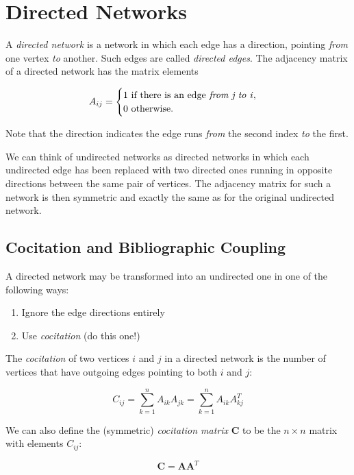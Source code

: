 \documentclass[12pt]{book}
\begin{document}
\section{Directed Networks}
A \textit{directed network} is a network in which each edge has a direction, pointing \textit{from} one vertex \textit{to} another.  Such edges are called \textit{directed edges}.  The adjacency matrix of a directed network has the matrix elements

\begin{equation}
A_{ij} = 
  \begin{cases}
    1$ if there is an edge \textit{from j to i}$, \\
    0$ otherwise$.
  \end{cases}
\end{equation}

Note that the direction indicates the edge runs \textit{from} the second index \textit{to} the first. 

We can think of undirected networks as directed networks in which each undirected edge has been replaced with two directed ones running in opposite directions between the same pair of vertices.  The adjacency matrix for such a network is then symmetric and exactly the same as for the original undirected network.

\subsection{Cocitation and Bibliographic Coupling}
A directed network may be transformed into an undirected one in one of the following ways:
\begin{enumerate}
  \item Ignore the edge directions entirely
  \item Use \textit{cocitation} (do this one!)
\end{enumerate}
The \textit{cocitation} of two vertices $i$ and $j$ in a directed network is the number of vertices that have outgoing edges pointing to both $i$ and $j$:

\begin{equation}
C_{ij} = \sum\limits_{k=1}^n A_{ik}A_{jk} = \sum\limits_{k=1}^n A_{ik}A_{kj}^T
\end{equation}

We can also define the (symmetric) \textit{cocitation matrix} \textbf{C} to be the $n \times n$ matrix with elements $C_{ij}$:

\begin{equation}
\mathbf{C}=\mathbf{AA}^T
\end{equation}
\end{document}
